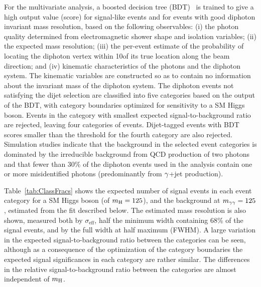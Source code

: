 \documentclass[11pt,twoside,a4paper,cmspaper,final]{cms-tdr}
\begin{document}
For the multivariate analysis, a boosted decision tree (BDT)~\cite{Yang2005370,Hocker:2007ht}
is trained to give a high output value (score) for signal-like events and for events with
good diphoton invariant mass resolution, based on
the following observables:
(i) the photon quality determined from
electromagnetic shower shape and isolation variables;
(ii) the expected mass resolution;
(iii) the per-event estimate of the probability of
locating the diphoton vertex within 10\mm of its true location along
the beam direction;
and (iv) kinematic characteristics of the photons and the diphoton system.
The kinematic variables are constructed so as to contain no
information about the invariant mass of the diphoton system.
The diphoton events not satisfying the dijet selection are classified into five categories based on the output of the BDT,
with category boundaries optimized for sensitivity to a SM Higgs boson.
Events in the category with smallest expected signal-to-background ratio are rejected,
leaving four categories of events.
Dijet-tagged events with BDT scores smaller than the threshold for the fourth
category are also rejected.
Simulation studies indicate that the background
in the selected event categories is dominated by the irreducible background from QCD production of two photons
and that fewer than 30\% of the diphoton events used in the analysis contain one or more
misidentified photons (predominantly from $\gamma$+jet production).

Table~\ref{tab:ClassFracs} shows the expected number of signal events
in each event category for a SM Higgs boson
(of $m_{\mathrm{H}}=125$\GeV),
and the background at $m_{\gamma\gamma} = 125$\GeV, estimated from the fit described below.
The estimated mass resolution is also shown, measured both by
$\sigma_\text{eff}$, half the minimum width
containing 68\% of the signal events, and by the full width
at half maximum (FWHM).
A large variation in the expected signal-to-background ratio between
the categories can be seen, although as a consequence of the
optimization of the category boundaries
the expected signal significances in each category are rather similar.
The differences in the relative signal-to-background ratio between the categories are almost independent
of $m_{\mathrm{H}}$.
\end{document}

